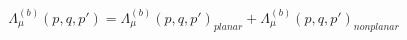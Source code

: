 \begin{equation}
\Lambda^{(b)}_{\mu}(p,q,p')=\Lambda^{(b)}_{\mu}(p,q,p')_{planar}+\Lambda^{(b)}_{\mu}(p,q,p')_{nonplanar}
\end{equation}

